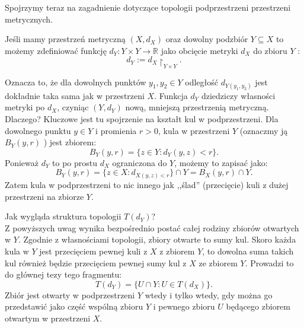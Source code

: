 Spojrzymy teraz na zagadnienie dotyczące topologii podprzestrzeni przestrzeni metrycznych.
\begin{remark}[1.1.8]
	Jeśli mamy przestrzeń metryczną $\left( X,d_{X} \right) $ oraz dowolny podzbiór $Y \subseteq  X$ to możemy zdefiniować funkcję $d_{Y}: Y\times Y \to \mathbb{R}$ jako obcięcie metryki $d_{X}$ do zbioru $Y$ :
	\[
	d_{Y} := d_{X}\restriction_{Y\times Y} 
	.\] 

	Oznacza to, że dla dowolnych punktów $y_1,y_2 \in Y$ odległość $d_{Y\left( y_1,y_2 \right) }$ jest dokładnie taka sama jak w przestrzeni $X$. Funkcja $d_{Y}$ dziedziczy własności metryki po $d_{X}$, czyniąc $\left( Y, d_{Y} \right) $ nową, mniejszą przestrzenią metryczną. Dlaczego? Kluczowe jest tu spojrzenie na kształt kul w podprzestrzeni. Dla dowolnego punktu $y \in Y$ i promienia $r > 0$, kula w przestrzeni $Y$ (oznaczmy ją $B_{Y}\left( y, r \right) $ ) jest zbiorem:
	\[
	B_{Y}\left( y,r \right) = \{z \in Y: d_{Y}\left( y,z \right) < r\} 
	.\] 
Ponieważ $d_{Y}$ to po prostu $d_{X}$ ograniczona do $Y$, możemy to zapisać jako:
\[
B_{Y}\left( y,r \right) = \{z \in X: d_{X\left( y,z \right) < r}\} \cap Y = B_{X}\left( y,r \right) \cap Y
.\] 
Zatem kula w podprzestrzeni to nic innego jak ,,ślad'' (przecięcie) kuli z dużej przestrzeni na zbiorze $Y$.

\noindent Jak wygląda struktura topologii $T\left( d_{Y} \right) $?\\
Z powyższych uwag wynika bezpośrednio postać całej rodziny zbiorów otwartych w $Y$. Zgodnie z własnościami topologii, zbiory otwarte to sumy kul. Skoro każda kula w $Y$ jest przecięciem pewnej kuli z $X$ z zbiorem $Y$, to dowolna suma takich kul również będzie przecięciem pewnej sumy kul z $X$ ze zbiorem $Y$. Prowadzi to do głównej tezy tego fragmentu:
\[
T\left( d_{Y} \right) = \{U\cap Y: U \in T\left( d_{X} \right) \} 
.\] 
Zbiór jest otwarty w podprzestrzeni $Y$ wtedy i tylko wtedy, gdy można go przedstawić jako część wspólną zbioru $Y$ i pewnego zbioru $U$ będącego zbiorem otwartym w przestrzeni $X$.
\end{remark} 


